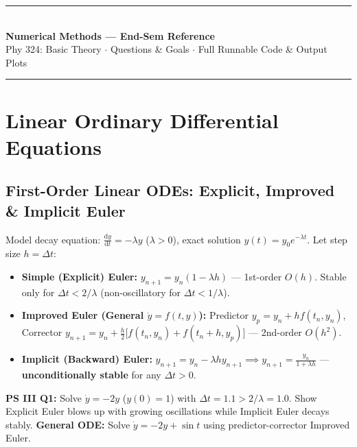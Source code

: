 \documentclass[10pt,a4paper]{article}
\newcommand{\dd}{\mathrm{d}}
\begin{document}
\begin{center}
{\color{navy}\rule{\linewidth}{1.8pt}}\\[0.35em]
{\LARGE\bfseries Numerical Methods --- End-Sem Reference}\\[4pt]
{\normalsize Phy 324: Basic Theory $\cdot$ Questions \& Goals $\cdot$ Full Runnable Code \& Output Plots}\\[0.3em]
{\color{navy}\rule{\linewidth}{1.8pt}}
\end{center}

\tableofcontents
\vspace{0.5em}

\section{Linear Ordinary Differential Equations}

\subsection{First-Order Linear ODEs: Explicit, Improved \& Implicit Euler}
\begin{theorybox}
Model decay equation: $\frac{\dd y}{\dd t} = -\lambda y$ ($\lambda > 0$), exact solution $y(t) = y_0 e^{-\lambda t}$. Let step size $h = \Delta t$:
\begin{itemize}
\item \textbf{Simple (Explicit) Euler:} $y_{n+1} = y_n(1 - \lambda h)$ — 1st-order $O(h)$. Stable only for \textbf{$\Delta t < 2/\lambda$} (non-oscillatory for $\Delta t < 1/\lambda$).
\item \textbf{Improved Euler (General $\dot y = f(t,y)$):} Predictor $y_p = y_n + h f(t_n, y_n)$, \; Corrector $y_{n+1} = y_n + \frac{h}{2}\big[f(t_n,y_n) + f(t_n+h, y_p)\big]$ — 2nd-order $O(h^2)$.
\item \textbf{Implicit (Backward) Euler:} $y_{n+1} = y_n - \lambda h y_{n+1} \implies y_{n+1} = \frac{y_n}{1 + \lambda h}$ — \textbf{unconditionally stable} for any $\Delta t > 0$.
\end{itemize}
\end{theorybox}

\begin{goalbox}
\textbf{PS III Q1:} Solve $\dot y = -2y$ ($y(0)=1$) with $\Delta t = 1.1 > 2/\lambda = 1.0$. Show Explicit Euler blows up with growing oscillations while Implicit Euler decays stably. \textbf{General ODE:} Solve $\dot y = -2y + \sin t$ using predictor-corrector Improved Euler.
\end{goalbox}
\end{document}
